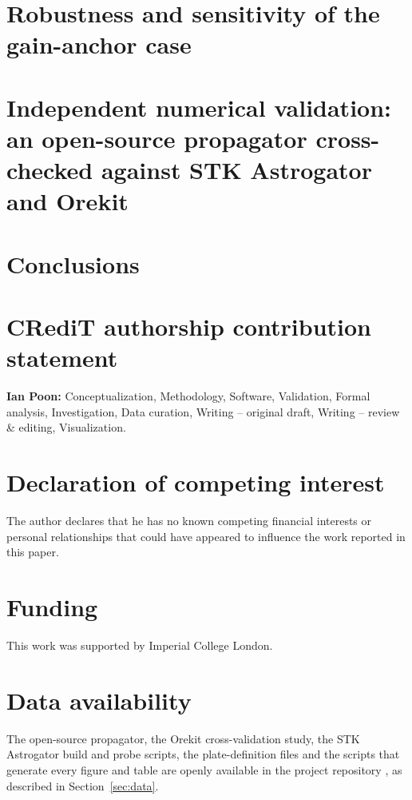 \documentclass[preprint,12pt]{elsarticle}
\begin{document}
\section{Robustness and sensitivity of the gain-anchor case}
\label{sec:sensitivity}


\section{Independent numerical validation: an open-source propagator cross-checked against STK Astrogator and Orekit}
\label{sec:validation}


\section{Conclusions}
\label{sec:conclusion}


\section*{CRediT authorship contribution statement}
\par\noindent \textbf{Ian Poon:} Conceptualization, Methodology, Software,
Validation, Formal analysis, Investigation, Data curation, Writing --
original draft, Writing -- review \& editing, Visualization.

\section*{Declaration of competing interest}
\par\noindent The author declares that he has no known competing financial
interests or personal relationships that could have appeared to influence
the work reported in this paper.

\section*{Funding}
\par\noindent This work was supported by Imperial College London.

\section*{Data availability}
\par\noindent The open-source propagator, the Orekit cross-validation study, the STK Astrogator build and probe scripts, the plate-definition files and the scripts that generate every figure and table are openly available in the project repository \citep{svarogPropagatorCode2026}, as described in Section~\ref{sec:data}.
\end{document}

